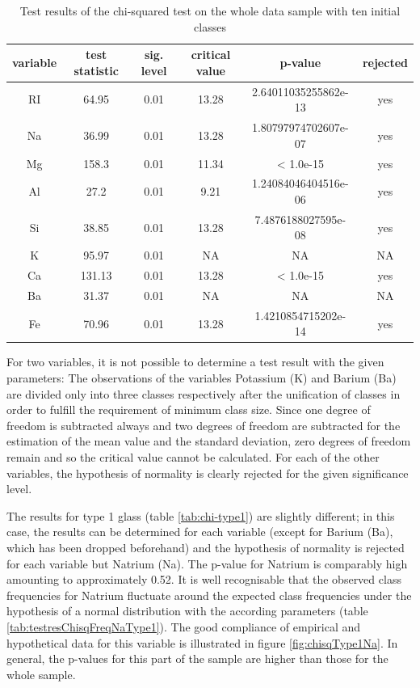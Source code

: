\documentclass[a4paper, 12pt, titlepage, headsepline, listof = totoc, bibliography = totoc, numbers = noenddot]{scrartcl}
\begin{document}
\begin{table}[h!]
\centering
\begin{tabular}{|cccccc|} \hline variable & test statistic & sig. level & critical value & p-value & rejected\\ \hline RI & 64.95 & 0.01 & 13.28 & 2.64011035255862e-13 & yes\\ 
Na & 36.99 & 0.01 & 13.28 & 1.80797974702607e-07 & yes\\ 
Mg & 158.3 & 0.01 & 11.34 & < 1.0e-15 & yes\\ 
Al & 27.2 & 0.01 & 9.21 & 1.24084046404516e-06 & yes\\ 
Si & 38.85 & 0.01 & 13.28 & 7.4876188027595e-08 & yes\\ 
K & 95.97 & 0.01 & NA & NA & NA\\ 
Ca & 131.13 & 0.01 & 13.28 & < 1.0e-15 & yes\\ 
Ba & 31.37 & 0.01 & NA & NA & NA\\ 
Fe & 70.96 & 0.01 & 13.28 & 1.4210854715202e-14 & yes\\ \hline \end{tabular}\caption{Test results of the chi-squared test on the whole data sample with ten initial classes}
\label{tab:chi-full}
\end{table}

For two variables, it is not possible to determine a test result with the given parameters: The observations of the variables Potassium (K) and Barium (Ba) are divided only into three classes respectively after the unification of classes in order to fulfill the requirement of minimum class size. Since one degree of freedom is subtracted always and two degrees of freedom are subtracted for the estimation of the mean value and the standard deviation, zero degrees of freedom remain and so the critical value cannot be calculated. For each of the other variables, the hypothesis of normality is clearly rejected for the given significance level.

The results for type 1 glass (table \ref{tab:chi-type1}) are slightly different; in this case, the results can be determined for each variable (except for Barium (Ba), which has been dropped beforehand) and the hypothesis of normality is rejected for each variable but Natrium (Na). The p-value for Natrium is comparably high amounting to approximately 0.52. It is well recognisable that the observed class frequencies for Natrium fluctuate around the expected class frequencies under the hypothesis of a normal distribution with the according parameters (table \ref{tab:testresChisqFreqNaType1}). The good compliance of empirical and hypothetical data for this variable is illustrated in figure \ref{fig:chisqType1Na}. In general, the p-values for this part of the sample are higher than those for the whole sample.
\end{document}
